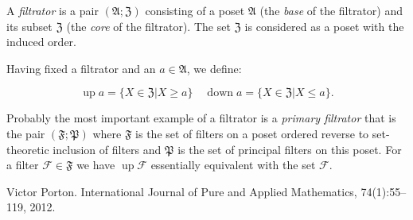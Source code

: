 \documentclass[12pt]{article}
\begin{document}
A \emph{filtrator} is a pair $(\mathfrak{A};\mathfrak{Z})$ consisting of a poset $\mathfrak{A}$ (the \emph{base} of the filtrator) and its subset $\mathfrak{Z}$ (the \emph{core} of the filtrator). The set $\mathfrak{Z}$ is considered as a poset with the induced order.

Having fixed a filtrator and an $a\in\mathfrak{A}$, we define:

$$\operatorname{up} a = \{ X\in\mathfrak{Z} | X \ge a \} \quad \operatorname{down} a = \{ X\in\mathfrak{Z} | X \le a \}.$$

Probably the most important example of a filtrator is a \emph{primary filtrator} that is the pair $(\mathfrak{F};\mathfrak{P})$ where $\mathfrak{F}$ is the set of filters on a poset ordered reverse to set-theoretic inclusion of filters and $\mathfrak{P}$ is the set of principal filters on this poset. For a filter $\mathcal{F}\in\mathfrak{F}$ we have $\operatorname{up}\mathcal{F}$ essentially equivalent with the set $\mathcal{F}$.

\begin{thebibliography}{1}
  Victor Porton.  International Journal of Pure and
  Applied Mathematics, 74(1):55--119, 2012.
\end{thebibliography}

\end{document}
